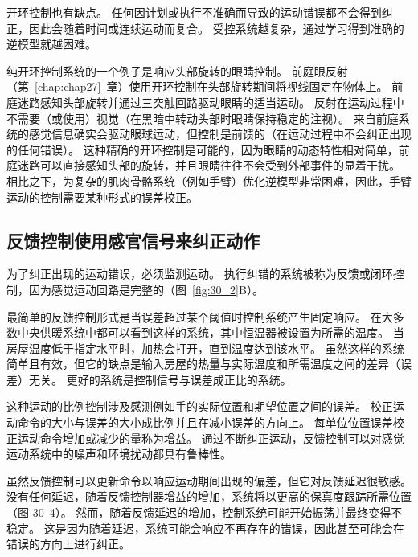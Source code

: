 开环控制也有缺点。
任何因计划或执行不准确而导致的运动错误都不会得到纠正，因此会随着时间或连续运动而复合。
受控系统越复杂，通过学习得到准确的逆模型就越困难。


纯开环控制系统的一个例子是响应头部旋转的眼睛控制。 前庭眼反射（第~\ref{chap:chap27}~章）使用开环控制在头部旋转期间将视线固定在物体上。
前庭迷路感知头部旋转并通过三突触回路驱动眼睛的适当运动。
反射在运动过程中不需要（或使用）视觉（在黑暗中转动头部时眼睛保持稳定的注视）。
来自前庭系统的感觉信息确实会驱动眼球运动，但控制是前馈的（在运动过程中不会纠正出现的任何错误）。
这种精确的开环控制是可能的，因为眼睛的动态特性相对简单，前庭迷路可以直接感知头部的旋转，并且眼睛往往不会受到外部事件的显着干扰。
相比之下，为复杂的肌肉骨骼系统（例如手臂）优化逆模型非常困难，因此，手臂运动的控制需要某种形式的误差校正。



\subsection{反馈控制使用感官信号来纠正动作}

为了纠正出现的运动错误，必须监测运动。
执行纠错的系统被称为反馈或闭环控制，因为感觉运动回路是完整的（图~\ref{fig:30_2}B）。


最简单的反馈控制形式是当误差超过某个阈值时控制系统产生固定响应。
在大多数中央供暖系统中都可以看到这样的系统，其中恒温器被设置为所需的温度。
当房屋温度低于指定水平时，加热会打开，直到温度达到该水平。
虽然这样的系统简单且有效，但它的缺点是输入房屋的热量与实际温度和所需温度之间的差异（误差）无关。
更好的系统是控制信号与误差成正比的系统。


这种运动的比例控制涉及感测例如手的实际位置和期望位置之间的误差。
校正运动命令的大小与误差的大小成比例并且在减小误差的方向上。
每单位位置误差校正运动命令增加或减少的量称为增益。
通过不断纠正运动，反馈控制可以对感觉运动系统中的噪声和环境扰动都具有鲁棒性。


虽然反馈控制可以更新命令以响应运动期间出现的偏差，但它对反馈延迟很敏感。
没有任何延迟，随着反馈控制器增益的增加，系统将以更高的保真度跟踪所需位置（图 30–4）。
然而，随着反馈延迟的增加，控制系统可能开始振荡并最终变得不稳定。
这是因为随着延迟，系统可能会响应不再存在的错误，因此甚至可能会在错误的方向上进行纠正。


